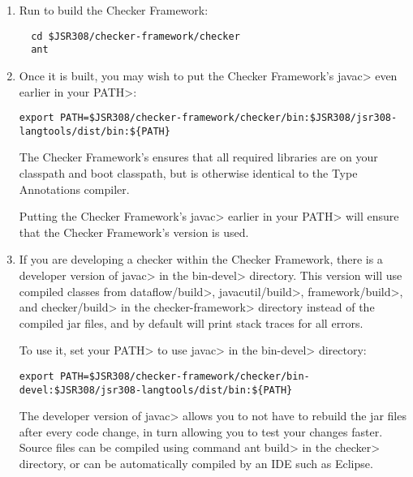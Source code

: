 \begin{enumerate}

\item
Run  to build the Checker Framework:

\begin{Verbatim}
  cd $JSR308/checker-framework/checker
  ant
\end{Verbatim}

\item
Once it is built, you may wish to put the Checker Framework's \<javac>
even earlier in your \<PATH>:

\begin{Verbatim}
export PATH=$JSR308/checker-framework/checker/bin:$JSR308/jsr308-langtools/dist/bin:${PATH}
\end{Verbatim}

The Checker Framework's  ensures that all required
libraries are on your classpath and boot classpath, but is otherwise
identical to the Type Annotations compiler.

Putting the Checker Framework's \<javac> earlier in your \<PATH> will
ensure that the Checker Framework's version is used.

\item
If you are developing a checker within the Checker Framework, there is
a developer version of \<javac> in the \<bin-devel> directory. This
version will use compiled classes from \<dataflow/build>,
\<javacutil/build>, \<framework/build>,
and \<checker/build> in the \<checker-framework> directory instead of
the compiled jar files, and by default will print stack traces for all
errors.

To use it, set your \<PATH> to use \<javac> in the \<bin-devel> directory:

\begin{Verbatim}
export PATH=$JSR308/checker-framework/checker/bin-devel:$JSR308/jsr308-langtools/dist/bin:${PATH}
\end{Verbatim}

The developer version of \<javac> allows you to not have to rebuild
the jar files after every code change, in turn allowing you to test
your changes faster. Source files can be compiled using command \<ant
build> in the \<checker> directory, or can be automatically compiled by
an IDE such as Eclipse.


\end{enumerate}
